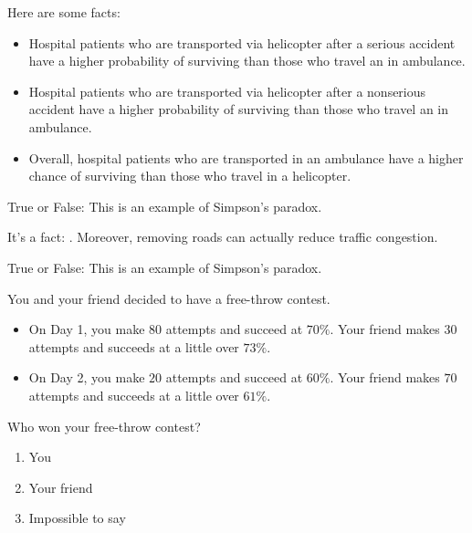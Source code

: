 \documentclass[nooutcomes,noauthor]{ximera}
\author{Bart Snapp}
\begin{document}
\maketitle



\begin{exercise}
  Here are some facts:
  \begin{itemize}
      \item Hospital patients who are transported via helicopter
        after a serious accident have a higher probability of
        surviving than those who travel an in ambulance.
      \item Hospital patients who are transported via helicopter
        after a nonserious accident have a higher probability of
        surviving than those who travel an in ambulance.
      \item Overall, hospital patients who are transported in an
        ambulance have a higher chance of surviving than those who travel in a helicopter.
  \end{itemize}
        
  
  True or False: This is an example of Simpson's paradox.
 
\end{exercise}




\begin{exercise}
  It's a fact: . Moreover,
  removing roads can actually reduce traffic congestion.

  
  True or False: This is an example of Simpson's paradox.

\end{exercise}

\begin{exercise}
  You and your friend decided to have a free-throw contest.
  \begin{itemize}
  \item On Day 1, you make $80$ attempts and succeed at $70\%$. Your
    friend makes $30$ attempts and succeeds at a little over $73\%$.
  \item On Day 2, you make $20$ attempts and succeed at $60\%$. Your friend makes $70$ attempts and succeeds at a little over $61\%$.
  \end{itemize}
  Who won your free-throw contest?
  \begin{enumerate}
  \item You
  \item Your friend
  \item Impossible to say
  \end{enumerate}

\end{exercise}
\end{document}
